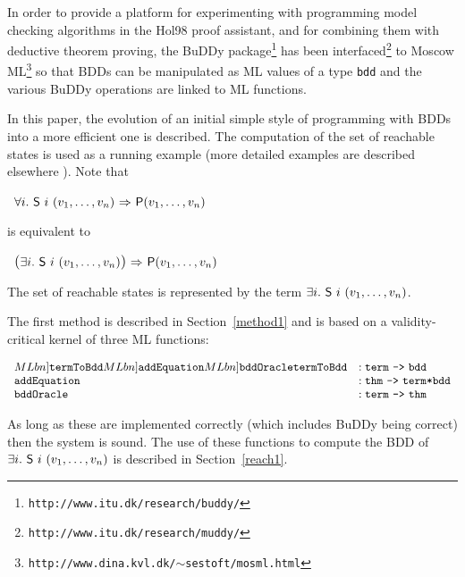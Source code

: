 \documentclass[12pt]{article}
\newcommand{\bnind}[1]{\index[MLbn]{#1}}
\newcommand{\tyind}[1]{\index[MLty]{#1}}
\newcommand{\con}[1]{\mbox{\sf #1}}
\newcommand{\ty}[1]{\mbox{\tt #1}}
\newcommand{\ml}[1]{{\tt #1}}
\newcommand\Hol{Hol98\xspace}
\newcommand{\Buddy}{BuDDy\xspace}
\newcommand\fun{\mbox{\tt{->}}}
\newcommand\imp{{\Rightarrow}}
\renewcommand{\prod}{\mbox{\tt{*}}}
\newcommand{\homedir}{\mbox{$\sim$}}
\begin{document}
In order to provide a platform for experimenting with programming
model checking algorithms in the \Hol{} proof assistant, and for
combining them with deductive theorem proving, the \Buddy{}
package\footnote{\texttt{http://www.itu.dk/research/buddy/}} has been
interfaced\footnote{\texttt{http://www.itu.dk/research/muddy/}} to Moscow 
ML\footnote{\texttt{http://www.dina.kvl.dk/{\homedir}sestoft/mosml.html}}
so that BDDs can be manipulated as ML values of a type \ty{bdd}\tyind{\ml{bdd}}
and the various \Buddy{} operations are linked to ML functions.

In this paper, the evolution of an initial simple style of programming
with BDDs into a more efficient one is described.  
The computation of
the set of reachable states is used as a running example
(more detailed examples are described elsewhere \cite{mjcg99a,GordonLarsen}).  
Note that

\smallskip

~$\forall i.~\con{S}~i~(v_1,\ldots,v_n)~\imp~\con{P}(v_1,\ldots,v_n)$

\smallskip

\noindent is equivalent to


\smallskip

~${\mbox{\large$($}}\exists i.~\con{S}~i~(v_1,\ldots,v_n){\mbox{\large$)$}}~\imp~\con{P}(v_1,\ldots,v_n)$

\smallskip
\noindent The set of reachable states is
represented by the term $\exists i.~ \con{S}~i~(v_1,\ldots,v_n)$.

The first method is described in Section~\ref{method1} and is based
on a validity-critical kernel of three
ML functions:


\smallskip

$\begin{array}{ll}\bnind{\ml{termToBdd}}\bnind{\ml{addEquation}}\bnind{\ml{bddOracle}}
\ml{termToBdd}   &: \ty{term}~\fun~\ty{bdd}\\
\ml{addEquation} &: \ty{thm}~\fun~\ty{term}\prod\ty{bdd}\\
\ml{bddOracle}   &: \ty{term}~\fun~\ty{thm}\\
\end{array}$

\smallskip

As long as these are implemented correctly (which includes
\Buddy{} being correct) then the system is sound.
The use of these functions to compute the BDD of $\exists i.~ \con{S}~i~(v_1,\ldots,v_n)$
is described in Section~\ref{reach1}.
\end{document}
